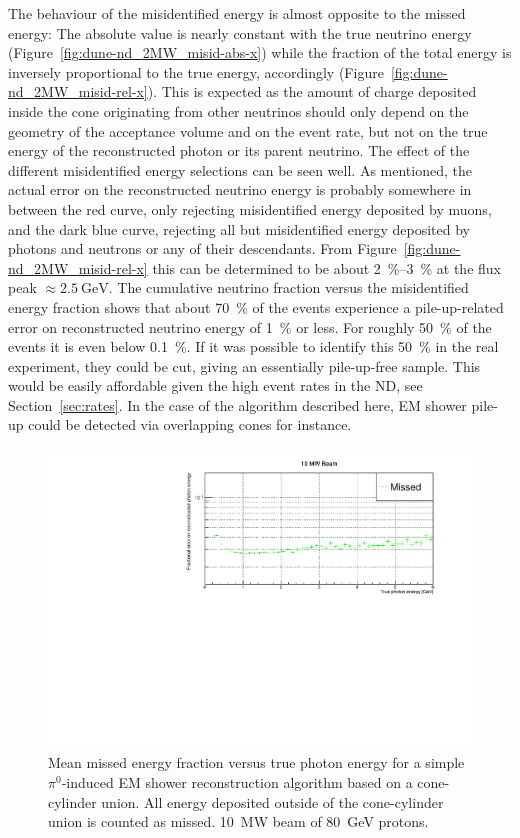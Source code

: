 \documentclass[a4paper]{article}
\begin{document}
The behaviour of the misidentified energy is almost opposite to the missed energy:
The absolute value is nearly constant with the true neutrino energy (Figure~\ref{fig:dune-nd_2MW_misid-abs-x}) while the fraction of the total energy is inversely proportional to the true energy, accordingly (Figure~\ref{fig:dune-nd_2MW_misid-rel-x}).
This is expected as the amount of charge deposited inside the cone originating from other neutrinos should only depend on the geometry of the acceptance volume  and on the event rate, but not on the true energy of the reconstructed photon or its parent neutrino.
The effect of the different misidentified energy selections can be seen well.
As mentioned, the actual error on the reconstructed neutrino energy is probably somewhere in between the red curve, only rejecting misidentified energy deposited by muons, and the dark blue curve, rejecting all but misidentified energy deposited by photons and neutrons or any of their descendants.
From Figure~\ref{fig:dune-nd_2MW_misid-rel-x} this can be determined to be about \SIrange{2}{3}{\percent} at the flux peak $\approx \SI{2.5}{\giga\electronvolt}$.
The cumulative neutrino fraction versus the misidentified energy fraction shows that about \SI{70}{\percent} of the events experience a pile-up-related error on reconstructed neutrino energy of \SI{1}{\percent} or less.
For roughly \SI{50}{\percent} of the events it is even below \SI{0.1}{\percent}.
If it was possible to identify this \SI{50}{\percent} in the real experiment, they could be cut, giving an essentially pile-up-free sample.
This would be easily affordable given the high event rates in the ND, see Section~\ref{sec:rates}.
In the case of the algorithm described here, EM shower pile-up could be detected via overlapping cones for instance.

\begin{figure}[tbp]
	\centering
	\includegraphics[width=\textwidth]{Figures/10MW/missed_rel_x}
	\caption[Pile-up study mean missed fractional vs.\ true photon energy, \SI{10}{\mega\watt} beam]{%
		Mean missed energy fraction versus true photon energy for a simple $\pi^0$-induced EM shower reconstruction algorithm based on a cone-cylinder union.
		All energy deposited outside of the cone-cylinder union is counted as missed.
		\SI{10}{\mega\watt} beam of \SI{80}{\giga\electronvolt} protons.
	}
	\label{fig:dune-nd_10MW_missed-rel-x}
\end{figure}
\end{document}
